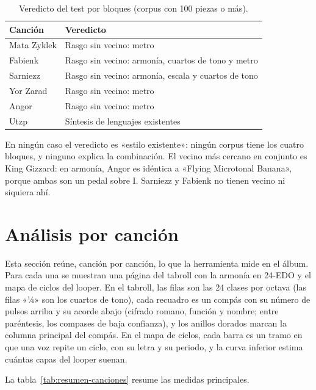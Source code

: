 \begin{table}[ht]
  \centering\small
  \caption{Veredicto del test por bloques (corpus con 100 piezas o más).}\label{tab:veredictos}
  \begin{tabularx}{\textwidth}{@{}l>{\raggedright\arraybackslash}X@{}}
    \toprule
    Canción & Veredicto \\
    \midrule
    Mata Zyklek & Rasgo sin vecino: metro \\
    Fabienk & Rasgo sin vecino: armonía, cuartos de tono y metro \\
    Sarniezz & Rasgo sin vecino: armonía, escala y cuartos de tono \\
    Yor Zarad & Rasgo sin vecino: metro \\
    Angor & Rasgo sin vecino: metro \\
    Utzp & Síntesis de lenguajes existentes \\
    \bottomrule
  \end{tabularx}
\end{table}

En ningún caso el veredicto es «estilo existente»: ningún corpus tiene los cuatro bloques, y ninguno explica la
combinación. El vecino más cercano en conjunto es King Gizzard: en armonía, Angor es idéntica a «Flying Microtonal
Banana», porque ambas son un pedal sobre I. Sarniezz y Fabienk no tienen vecino ni siquiera ahí.

\section{Análisis por canción}\label{sec:por-cancion}

Esta sección reúne, canción por canción, lo que la herramienta mide en el álbum. Para cada una se muestran una página del
tabroll con la armonía en 24-EDO y el mapa de ciclos del looper. En el tabroll, las filas son las 24 clases por octava
(las filas «¼» son los cuartos de tono), cada recuadro es un compás con su número de pulsos arriba y su acorde abajo
(cifrado romano, función y nombre; entre paréntesis, los compases de baja confianza), y los anillos dorados marcan la
columna principal del compás. En el mapa de ciclos, cada barra es un tramo en que una voz repite un ciclo, con su letra y
su periodo, y la curva inferior estima cuántas capas del looper suenan.

La tabla~\ref{tab:resumen-canciones} resume las medidas principales.

